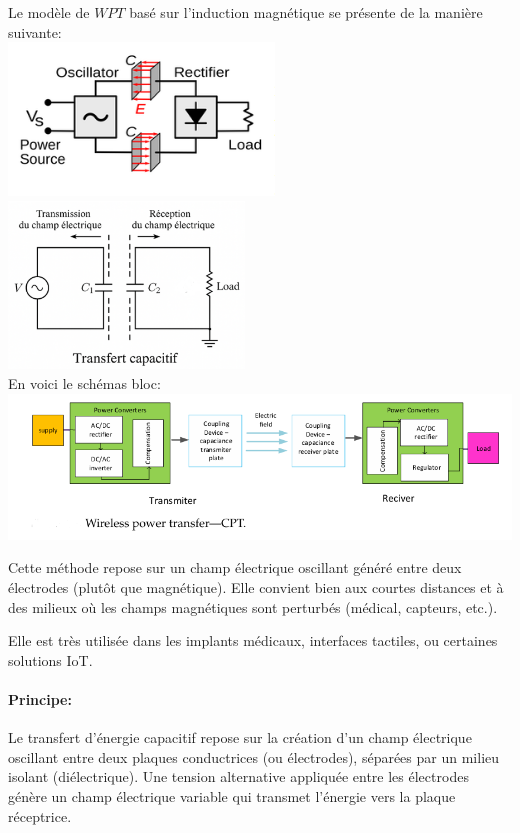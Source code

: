 \documentclass[12pt,a4paper,titlepage,notitlepage]{article}
\begin{document}
	Le  modèle de $WPT$ basé sur l'induction magnétique se présente de la manière suivante:\\
	\includegraphics[width=0.53\textwidth]{WPT_capacitif} 
	\includegraphics[width=0.47\textwidth]{WPT_capacitif_3}
	\\ En voici le schémas bloc:\\
	\includegraphics[width=1.1\textwidth]{WPT_capacitif_1}
	
	Cette méthode repose sur un champ électrique oscillant généré entre deux électrodes (plutôt que magnétique). Elle convient bien aux courtes distances et à des milieux où les champs magnétiques sont perturbés (médical, capteurs, etc.).
	
	Elle est très utilisée dans les implants médicaux, interfaces tactiles, ou certaines solutions IoT.
	\paragraph{Principe: \\}
	Le transfert d’énergie capacitif repose sur la création d’un champ électrique oscillant entre deux plaques conductrices (ou électrodes), séparées par un milieu isolant (diélectrique). Une tension alternative appliquée entre les électrodes génère un champ électrique variable qui transmet l’énergie vers la plaque réceptrice.
\end{document}
